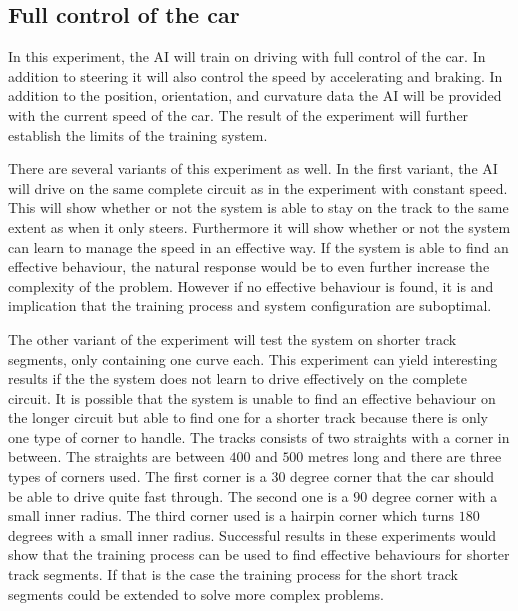 \subsection{Full control of the car}
In this experiment, the AI will train on driving with full control of the car. In addition to steering it will also control the speed by accelerating and braking. In addition to the position, orientation, and curvature data the AI will be provided with the current speed of the car. 
The result of the experiment will further establish the limits of the training system. 

There are several variants of this experiment as well. In the first variant, the AI will drive on the same complete circuit as in the experiment with constant speed. This will show whether or not the system is able to stay on the track to the same extent as when it only steers. Furthermore it will show whether or not the system can learn to manage the speed in an effective way. If the system is able to find an effective behaviour, the natural response would be to even further increase the complexity of the problem. However if no effective behaviour is found, it is and implication that the training process and system configuration are suboptimal. 

The other variant of the experiment will test the system on shorter track segments, only containing one curve each. This experiment can yield interesting results if the the system does not learn to drive effectively on the complete circuit. It is possible that the system is unable to find an effective behaviour on the longer circuit but able to find one for a shorter track because there is only one type of corner to handle. The tracks consists of two straights with a corner in between. The straights are between $400$ and $500$ metres long and there are three types of corners used. The first corner is a $30$ degree corner that the car should be able to drive quite fast through. The second one is a $90$ degree corner with a small inner radius. The third corner used is a hairpin corner which turns $180$ degrees with a small inner radius. Successful results in these experiments would show that the training process can be used to find effective behaviours for shorter track segments. If that is the case the training process for the short track segments could be extended to solve more complex problems. 


